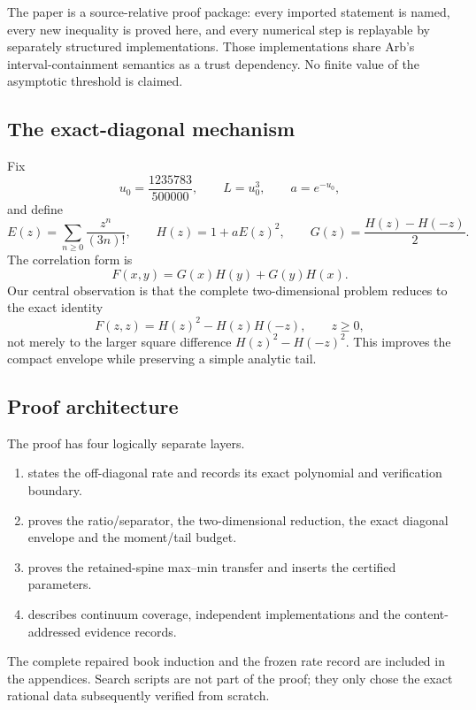 The paper is a source-relative proof package: every imported statement is
named, every new inequality is proved here, and every numerical step is
replayable by separately structured implementations.  Those implementations
share Arb's interval-containment semantics as a trust dependency.  No finite
value of the asymptotic threshold is claimed.

\subsection{The exact-diagonal mechanism}

Fix
\[
 u_0=\frac{1235783}{500000},\qquad L=u_0^3,
 \qquad a=e^{-u_0},
\]
and define
\[
 E(z)=\sum_{n\ge0}\frac{z^n}{(3n)!},\qquad
 H(z)=1+aE(z)^2,\qquad
 G(z)=\frac{H(z)-H(-z)}2.
\]
The correlation form is
\[
 F(x,y)=G(x)H(y)+G(y)H(x).
\]
Our central observation is that the complete two-dimensional problem reduces
to the exact identity
\[
 F(z,z)=H(z)^2-H(z)H(-z),\qquad z\ge0,
\]
not merely to the larger square difference
\(H(z)^2-H(-z)^2\).  This improves the compact envelope while preserving a
simple analytic tail.

\subsection{Proof architecture}

The proof has four logically separate layers.

\begin{enumerate}[label=(\roman*)]
\item {} states the off-diagonal rate and records its exact
      polynomial and verification boundary.
\item {} proves the ratio/separator, the two-dimensional
      reduction, the exact diagonal envelope and the moment/tail budget.
\item {} proves the retained-spine max--min transfer and
      inserts the certified parameters.
\item {} describes continuum coverage, independent
      implementations and the content-addressed evidence records.
\end{enumerate}

The complete repaired book induction and the frozen rate record are included
in the appendices.  Search scripts are not part of the proof; they only chose
the exact rational data subsequently verified from scratch.
